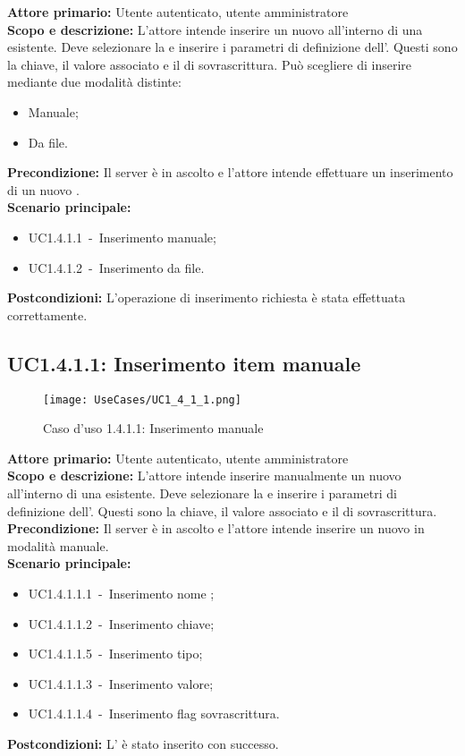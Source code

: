 \documentclass{scalatekids-article}
\begin{document}
\textbf{Attore primario:} Utente autenticato, utente amministratore\\
\textbf{Scopo e descrizione:} L'attore intende inserire un nuovo  all'interno di una  esistente. Deve selezionare la  e inserire i parametri di definizione dell'. Questi sono la chiave, il valore associato e il  di sovrascrittura. Può scegliere di inserire mediante due modalità distinte:
\begin{itemize}
\item Manuale;
\item Da file.
\end{itemize}
\textbf{Precondizione:} Il server è in ascolto e l'attore intende effettuare un inserimento di un nuovo .\\
\textbf{Scenario principale:}
\begin{itemize}
\item UC1.4.1.1\ -\ Inserimento  manuale;
\item UC1.4.1.2\ -\ Inserimento  da file.
\end{itemize}
\textbf{Postcondizioni:} L'operazione di inserimento richiesta è stata effettuata correttamente.

\subsection{UC1.4.1.1: Inserimento item manuale}

\begin{figure}[H]
  \begin{center}
    \texttt{[image: UseCases/UC1\_4\_1\_1.png]}
    \caption{Caso d'uso 1.4.1.1: Inserimento  manuale}
  \end{center}
\end{figure}
\textbf{Attore primario:} Utente autenticato, utente amministratore\\
\textbf{Scopo e descrizione:} L'attore intende inserire manualmente un nuovo  all'interno di una  esistente. Deve selezionare la  e inserire i parametri di definizione dell'. Questi sono la chiave, il valore associato e il  di sovrascrittura.\\
\textbf{Precondizione:} Il server è in ascolto e l'attore intende inserire un nuovo  in modalità manuale.\\
\textbf{Scenario principale:}
\begin{itemize}
\item UC1.4.1.1.1\ -\ Inserimento nome ;
\item UC1.4.1.1.2\ -\ Inserimento chiave;
\item UC1.4.1.1.5\ -\ Inserimento tipo;
\item UC1.4.1.1.3\ -\ Inserimento valore;
\item UC1.4.1.1.4\ -\ Inserimento flag sovrascrittura.
\end{itemize}
\textbf{Postcondizioni:} L' è stato inserito con successo.
\end{document}

